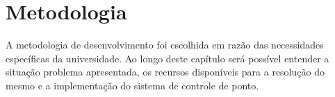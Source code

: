 \chapter{Metodologia}
\label{metodologia}

A metodologia de desenvolvimento foi escolhida em razão das necessidades específicas da universidade. Ao longo deste capítulo será possível entender a situação problema apresentada, os recursos disponíveis para a resolução do mesmo e a implementação do sistema de controle de ponto.



